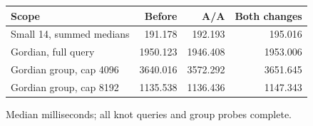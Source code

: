 \begin{center}\small
\begin{tabular}{@{}lrrr@{}}
\toprule
Scope & Before & A/A & Both changes \\
\midrule
Small 14, summed medians & 191.178 & 192.193 & 195.016 \\
Gordian, full query & 1950.123 & 1946.408 & 1953.006 \\
Gordian group, cap 4096 & 3640.016 & 3572.292 & 3651.645 \\
Gordian group, cap 8192 & 1135.538 & 1136.436 & 1147.343 \\
\bottomrule
\end{tabular}
\end{center}
Median milliseconds; all knot queries and group probes complete.
